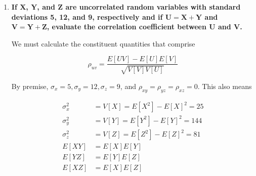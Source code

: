 \documentclass[10pt, oneside]{article}   	%
\theoremstyle{definition}
\newtheorem*{thm*}{Theorem}
\begin{document}
\begin{enumerate}[label=7.\arabic*]
  \begin{thm*}
  If $y = ax + b$ is the least-squares approximation to $E[Y | x]$ and if $E[Y | x]$ is in fact a linear function of $x$, that is
  
  \[ E[Y | x] = a'x + b' \]
  
  then $a = a'$ and $b = b'$. An analogous statement holds for the regression of $X$ on $Y$.
  \end{thm*}
  
  By premise, $a,b$ are such that $E[(E[Y | X] - (aX + b))^2] = E[((a'X + b') - (aX + b))^2]$ is minimized. Expanding, the expression, we find
  
  \begin{align*}
  E[((a'X + b') - (aX + b))^2] &= E[((a' - a)X + (b' - b))^2] \\
  &= E[(a'-a)^2 X^2 + 2(a' - a)(b' - b) X = (b' - b)^2] \\
  &= (a' - a)^2 E[X^2] + 2(a' - a) (b' - b) E[X] + (b' - b)^2
  \end{align*}
  
  Observe that $(a' - a)^2 \geq 0$, as does $E[X^2] \geq 0$ (an average of exclusively zero or positive values is necessarily zero or positive) and $(b' - b)^2 \geq 0$. Since we wish to minimize the above expression, it follows that the only way to do so is for $a' - a = b' - b = 0$. Then $E[(E[Y | X] - (aX + b))^2] = 0$, which is indeed the lowest value it can take given that the argument of the expectation is a square term, and $a' = a, b' = b$.

\item  \begin{tcolorbox}[
  colback=Cerulean!5!white,
  colframe=Cerulean!75!black]
  \textbf{If $\bm{X}$, $\bm{Y}$, and $\bm{Z}$ are uncorrelated random variables with standard deviations 5, 12, and 9, respectively and if $\bm{U = X + Y}$ and $\bm{V = Y + Z}$, evaluate the correlation coefficient between $\bm{U}$ and $\bm{V}$.}
  \end{tcolorbox}
  
  We must calculate the constituent quantities that comprise
  
  \[ \rho_{uv} = \frac{E[UV] - E[U] E[V]}{\sqrt{V[V] V[U]}} \]
  
  By premise, $\sigma_x = 5, \sigma_y = 12, \sigma_z = 9$, and $\rho_{xy} = \rho_{yz} = \rho_{xz} = 0$. This also means
  
  \begin{align*}
  \sigma^2_x &= V[X] = E[X^2] - E[X]^2 = 25 \\
  \sigma^2_y &= V[Y] = E[Y^2] - E[Y]^2 = 144 \\
  \sigma^2_z &= V[Z] = E[Z^2] - E[Z]^2 = 81 \\
  E[XY] &= E[X] E[Y] \\
  E[YZ] &= E[Y] E[Z] \\
  E[XZ] &= E[X] E[Z]
  \end{align*}
  

\end{enumerate}
\end{document}
